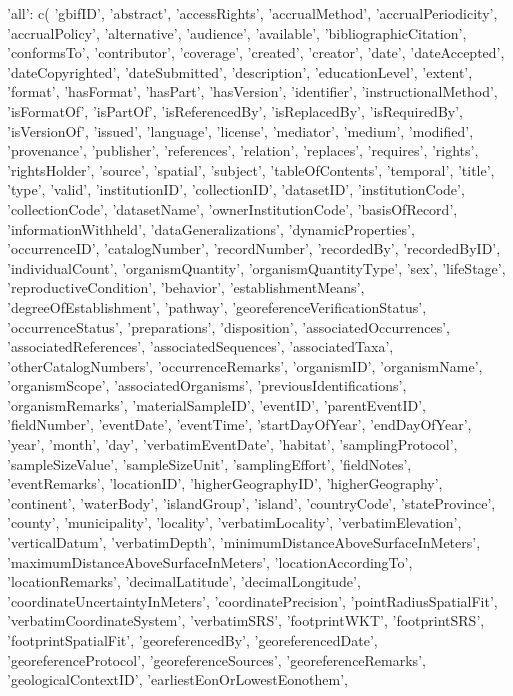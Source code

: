 \documentclass[a4paper]{book}
\begin{document}
\begin{Details}
'all':
c(
'gbifID',
'abstract',
'accessRights',
'accrualMethod',
'accrualPeriodicity',
'accrualPolicy',
'alternative',
'audience',
'available',
'bibliographicCitation',
'conformsTo',
'contributor',
'coverage',
'created',
'creator',
'date',
'dateAccepted',
'dateCopyrighted',
'dateSubmitted',
'description',
'educationLevel',
'extent',
'format',
'hasFormat',
'hasPart',
'hasVersion',
'identifier',
'instructionalMethod',
'isFormatOf',
'isPartOf',
'isReferencedBy',
'isReplacedBy',
'isRequiredBy',
'isVersionOf',
'issued',
'language',
'license',
'mediator',
'medium',
'modified',
'provenance',
'publisher',
'references',
'relation',
'replaces',
'requires',
'rights',
'rightsHolder',
'source',
'spatial',
'subject',
'tableOfContents',
'temporal',
'title',
'type',
'valid',
'institutionID',
'collectionID',
'datasetID',
'institutionCode',
'collectionCode',
'datasetName',
'ownerInstitutionCode',
'basisOfRecord',
'informationWithheld',
'dataGeneralizations',
'dynamicProperties',
'occurrenceID',
'catalogNumber',
'recordNumber',
'recordedBy',
'recordedByID',
'individualCount',
'organismQuantity',
'organismQuantityType',
'sex',
'lifeStage',
'reproductiveCondition',
'behavior',
'establishmentMeans',
'degreeOfEstablishment',
'pathway',
'georeferenceVerificationStatus',
'occurrenceStatus',
'preparations',
'disposition',
'associatedOccurrences',
'associatedReferences',
'associatedSequences',
'associatedTaxa',
'otherCatalogNumbers',
'occurrenceRemarks',
'organismID',
'organismName',
'organismScope',
'associatedOrganisms',
'previousIdentifications',
'organismRemarks',
'materialSampleID',
'eventID',
'parentEventID',
'fieldNumber',
'eventDate',
'eventTime',
'startDayOfYear',
'endDayOfYear',
'year',
'month',
'day',
'verbatimEventDate',
'habitat',
'samplingProtocol',
'sampleSizeValue',
'sampleSizeUnit',
'samplingEffort',
'fieldNotes',
'eventRemarks',
'locationID',
'higherGeographyID',
'higherGeography',
'continent',
'waterBody',
'islandGroup',
'island',
'countryCode',
'stateProvince',
'county',
'municipality',
'locality',
'verbatimLocality',
'verbatimElevation',
'verticalDatum',
'verbatimDepth',
'minimumDistanceAboveSurfaceInMeters',
'maximumDistanceAboveSurfaceInMeters',
'locationAccordingTo',
'locationRemarks',
'decimalLatitude',
'decimalLongitude',
'coordinateUncertaintyInMeters',
'coordinatePrecision',
'pointRadiusSpatialFit',
'verbatimCoordinateSystem',
'verbatimSRS',
'footprintWKT',
'footprintSRS',
'footprintSpatialFit',
'georeferencedBy',
'georeferencedDate',
'georeferenceProtocol',
'georeferenceSources',
'georeferenceRemarks',
'geologicalContextID',
'earliestEonOrLowestEonothem',

\end{Details}
\end{document}
